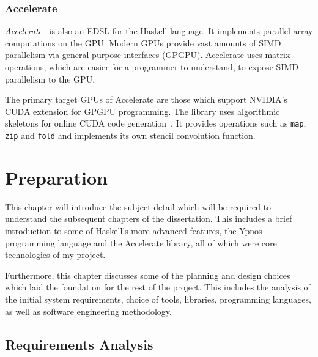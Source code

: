 \documentclass[12pt,a4paper,twoside]{scrbook}
\begin{document}
\subsection{Accelerate}

\emph{Accelerate}~\cite{acc-damp11} is also an EDSL for the Haskell language.
It implements parallel array computations on the GPU. Modern GPUs provide vast
amounts of SIMD parallelism via general purpose interfaces (GPGPU). Accelerate
uses matrix operations, which are easier for a programmer to understand, to
expose SIMD parallelism to the GPU.

The primary target GPUs of Accelerate are those which support NVIDIA's CUDA
extension for GPGPU programming. The library uses algorithmic skeletons for
online CUDA code generation~\cite{cole1989}. It provides operations such as
\texttt{map}, \texttt{zip} and \texttt{fold} and implements its own stencil
convolution function.


\chapter{Preparation}

This chapter will introduce the subject detail which will be required to
understand the subsequent chapters of the dissertation. This includes a brief
introduction to some of Haskell's more advanced features, the Ypnos programming
language and the Accelerate library, all of which were core technologies of my
project.

Furthermore, this chapter discusses some of the planning and design choices
which laid the foundation for the rest of the project. This includes the
analysis of the initial system requirements, choice of tools, libraries,
programming languages, as well as software engineering methodology.

\section{Requirements Analysis}
\label{sec:reqanal}

\newcommand{\low}{\ding{108}}
\newcommand{\medium}{\low\low}
\newcommand{\high}{\low\medium}

\newcommand{\mc}[1]{\multicolumn{2}{p{8cm}|}{#1}}
\newcommand{\stripe}[1]{\hline\multicolumn{5}{c}{#1}\\\hline}
\newcommand{\tblheaders}[1]{#1\\ \hline}
\newcommand{\tick}{\ding{52}}
\end{document}
